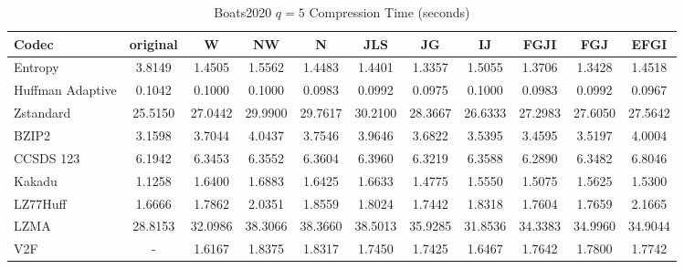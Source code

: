 \documentclass{article}
\begin{document}
\begin{table}[h!]
\centering
\caption{Boats2020 $q=5$ Compression Time (seconds)}
\begin{tabular}{|l|cccccccccc|}
\hline
Codec &  original &       W &      NW &       N &     JLS &      JG &      IJ &    FGJI &     FGJ &    EFGI \\
\hline
Entropy & 3.8149 & 1.4505 & 1.5562 & 1.4483 & 1.4401 & 1.3357 & 1.5055 & 1.3706 & 1.3428 & 1.4518         \\
\hline
Huffman Adaptive &    0.1042 &  0.1000 &  0.1000 &  0.0983 &  0.0992 &  0.0975 &  0.1000 &  0.0983 &  0.0992 &  0.0967 \\
Zstandard        &   25.5150 & 27.0442 & 29.9900 & 29.7617 & 30.2100 & 28.3667 & 26.6333 & 27.2983 & 27.6050 & 27.5642 \\
BZIP2            &    3.1598 &  3.7044 &  4.0437 &  3.7546 &  3.9646 &  3.6822 &  3.5395 &  3.4595 &  3.5197 &  4.0004 \\
CCSDS 123        &    6.1942 &  6.3453 &  6.3552 &  6.3604 &  6.3960 &  6.3219 &  6.3588 &  6.2890 &  6.3482 &  6.8046 \\
Kakadu           &    1.1258 &  1.6400 &  1.6883 &  1.6425 &  1.6633 &  1.4775 &  1.5550 &  1.5075 &  1.5625 &  1.5300 \\
LZ77Huff         &    1.6666 &  1.7862 &  2.0351 &  1.8559 &  1.8024 &  1.7442 &  1.8318 &  1.7604 &  1.7659 &  2.1665 \\
LZMA             &   28.8153 & 32.0986 & 38.3066 & 38.3660 & 38.5013 & 35.9285 & 31.8536 & 34.3383 & 34.9960 & 34.9044 \\
V2F              &    - &  1.6167 &  1.8375 &  1.8317 &  1.7450 &  1.7425 &  1.6467 &  1.7642 &  1.7800 &  1.7742 \\
\hline
\end{tabular}
\end{table}

\newpage
\end{document}
